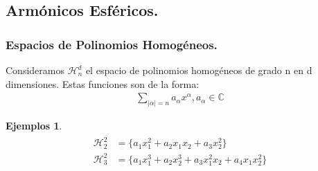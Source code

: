 \documentclass{beamer}
\theoremstyle{plain}
\theoremstyle{definition}
\theoremstyle{plain}
\theoremstyle{definition}
\theoremstyle{remark}
\theoremstyle{definition}
\newtheorem{ejemplos}[thm]{Ejemplos}
\begin{document}
\subsection{Armónicos Esféricos.}
\begin{frame}
\end{frame}
\begin{frame}
	\frametitle{Espacios de Polinomios Homogéneos.}
	Consideramos $\mathcal{H}^d_n$ el espacio de polinomios homogéneos de grado n en d dimensiones.
	Estas funciones son de la forma:
	\begin{gather*}
		\sum_{|\alpha|=n}a_\alpha x^\alpha, a_\alpha \in \mathds{C}
	\end{gather*}

	\begin{ejemplos}
		\begin{gather*}
		\begin{aligned}
		\mathcal{H}^2_2 &= \{ a_1x_1^2 + a_2x_1x_2 + a_3x_2^2\} \\
		\mathcal{H}^2_3 &= \{ a_1x_1^3 + a_2x_2^3 + a_3x_1^2x_2 + a_4x_1x_2^2 \}
		\end{aligned}
		\end{gather*}
	\end{ejemplos}
\end{frame}
\end{document}
